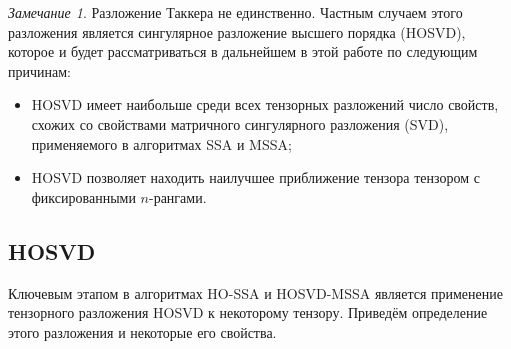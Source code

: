 \documentclass[specialist,
    substylefile = spbu.rtx,
    subf,href,colorlinks=true, 12pt]{disser}
\theoremstyle{plain}
\theoremstyle{definition}
\newtheorem{definition}{Определение}[section]
\theoremstyle{remark}
\newtheorem*{remark}{Замечание}
\begin{document}
    \begin{remark}
        Разложение Таккера не единственно.
        Частным случаем этого разложения является сингулярное разложение высшего порядка (HOSVD),
        которое и будет рассматриваться в дальнейшем в этой работе по следующим причинам:
        \begin{itemize}
            \item HOSVD имеет наибольше среди всех тензорных разложений 
            число свойств, схожих со свойствами матричного сингулярного разложения (SVD),
            применяемого в алгоритмах SSA и MSSA;
            \item HOSVD позволяет находить наилучшее приближение тензора тензором с
            фиксированными $n$-рангами.
        \end{itemize}
    \end{remark}
    
    
    \subsection{HOSVD}\label{subsec:hosvd}
    Ключевым этапом в алгоритмах HO-SSA и HOSVD-MSSA является применение тензорного разложения HOSVD к некоторому тензору.
    Приведём определение этого разложения и некоторые его свойства.

\end{document}
